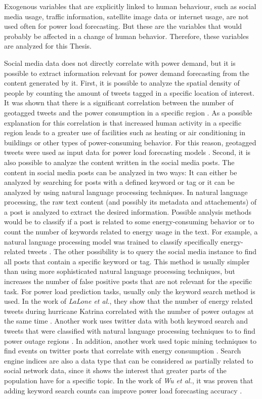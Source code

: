 Exogenous variables that are explicitly linked to human behaviour, 
such as social media usage, traffic information, satellite image data or 
internet usage, are not used often for power load forecasting. 
But these are the variables that would probably be affected in a change of 
human behavior. Therefore, these variables are analyzed for this Thesis.

Social media data does not directly correlate with power demand, but it is
possible to extract information relevant for power demand forecasting
from the content generated by it.
First, it is possible to analyze the spatial density of people by 
counting the amount of tweets tagged in a specific location of interest. 
It was shown that there is a significant
correlation between the number of geotagged tweets
and the power consumption in a specific region \cite{twittergeoloccorr}.
As a possible explanation for this correlation is that 
increased human activity in a specific region leads to a greater 
use of facilities such as heating or air conditioning in buildings or 
other types of power-consuming behavior.
For this reason, geotagged tweets were used as input data for 
power load forecasting models 
\cite{twittergeolocforecasting} \cite{twittergeolocforecasting2}.
Second, it is also possible to analyze the content written in the 
social media posts. The content in social media posts can be 
analyzed in two ways: 
It can either be analyzed by searching for posts with a defined keyword or tag
or it can be analyzed by using natural language processing techniques. 
In natural language processing, the raw text content 
(and possibly its metadata and attachements) of a post is analyzed
to extract the desired information. Possible analysis
methods would be to classify if a post is related to some energy-consuming
behavior or to count the number of keywords related to energy usage in the text.
For example, a natural language processing model was trained to 
classify specifically energy-related tweets \cite{energybert}.
The other possibility is to query the social media instance 
to find all posts that contain a specific keyword or tag.
This method is usually simpler than using more sophisticated natural 
language processing techniques, but increases the number of false positive 
posts that are not relevant for the specific task.
For power load prediction tasks, usually only the keyword search method is used.
In the work of \textit{LaLone et al.}, they show that the number of energy
related tweets during hurricane Katrina correlated with the number of 
power outages at the same time \cite{poweroutagetwitter}.
Another work uses twitter data with both keyword search and 
tweets that were classified with natural language processing techniques to
to find power outage regions \cite{twitterpoweroutagelighttime}.
In addition, another work used topic mining techniques to find
events on twitter posts that correlate with energy consumption 
\cite{twittertopicevent}.
Search engine indices are also a data type that can be considered 
as partially related to social network data, since it shows the 
interest that greater parts of the population have for a specific topic.
In the work of \textit{Wu et al.}, it was proven that adding 
keyword search counts can improve power load forecasting accuracy 
\cite{googlepowerforecast}.

